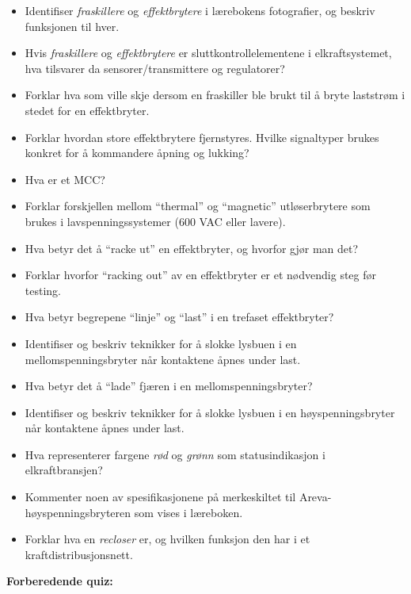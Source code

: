 \begin{itemize}
\item{} Identifiser {\it fraskillere} og {\it effektbrytere} i lærebokens fotografier, og beskriv funksjonen til hver.
\item{} Hvis {\it fraskillere} og {\it effektbrytere} er sluttkontrollelementene i elkraftsystemet, hva tilsvarer da sensorer/transmittere og regulatorer?
\item{} Forklar hva som ville skje dersom en fraskiller ble brukt til å bryte laststrøm i stedet for en effektbryter.
\item{} Forklar hvordan store effektbrytere fjernstyres. Hvilke signaltyper brukes konkret for å kommandere åpning og lukking?
\item{} Hva er et MCC?
\item{} Forklar forskjellen mellom ``thermal'' og ``magnetic'' utløserbrytere som brukes i lavspenningssystemer (600 VAC eller lavere).
\item{} Hva betyr det å ``racke ut'' en effektbryter, og hvorfor gjør man det?
\item{} Forklar hvorfor ``racking out'' av en effektbryter er et nødvendig steg før testing.
\item{} Hva betyr begrepene ``linje'' og ``last'' i en trefaset effektbryter?
\item{} Identifiser og beskriv teknikker for å slokke lysbuen i en mellomspenningsbryter når kontaktene åpnes under last.
\item{} Hva betyr det å ``lade'' fjæren i en mellomspenningsbryter?
\item{} Identifiser og beskriv teknikker for å slokke lysbuen i en høyspenningsbryter når kontaktene åpnes under last.
\item{} Hva representerer fargene {\it rød} og {\it grønn} som statusindikasjon i elkraftbransjen?
\item{} Kommenter noen av spesifikasjonene på merkeskiltet til Areva-høyspenningsbryteren som vises i læreboken.
\item{} Forklar hva en {\it recloser} er, og hvilken funksjon den har i et kraftdistribusjonsnett.
\end{itemize}











\vfil \eject

\noindent
{\bf Forberedende quiz:}

